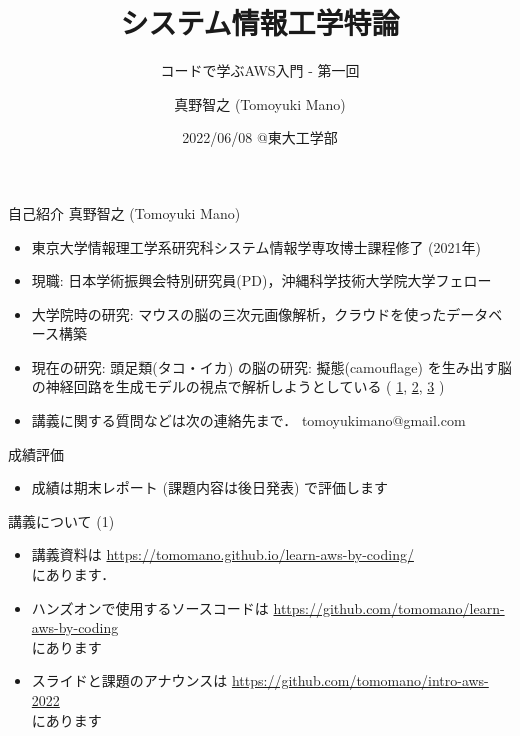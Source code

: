 \documentclass[unicode,11pt]{beamer}
\title{システム情報工学特論}
\subtitle{コードで学ぶAWS入門 - 第一回}
\author{真野智之 (Tomoyuki Mano)}
\institute[OIST]{Okinawa Institute of Science and Technology}
\date{2022/06/08 @東大工学部}
\begin{document}
\frame{\titlepage}

\begin{frame}{自己紹介}
真野智之 (Tomoyuki Mano)
\begin{itemize}
    \item 東京大学情報理工学系研究科システム情報学専攻博士課程修了 (2021年)
    \item 現職: 日本学術振興会特別研究員(PD)，沖縄科学技術大学院大学フェロー
    \item 大学院時の研究: マウスの脳の三次元画像解析，クラウドを使ったデータベース構築
    \item 現在の研究: 頭足類(タコ・イカ) の脳の研究: 擬態(camouflage) を生み出す脳の神経回路を生成モデルの視点で解析しようとしている
    (
    \href{https://twitter.com/CephWarden/status/1142083856893263872}{1},
    \href{https://twitter.com/CephWarden/status/1384644335069667334}{2},
    \href{https://twitter.com/CephWarden/status/1232307456346181632}{3}
    )
    \item 講義に関する質問などは次の連絡先まで． tomoyukimano@gmail.com
\end{itemize}
\end{frame}

\begin{frame}{成績評価}
\begin{itemize}
    \item 成績は期末レポート (課題内容は後日発表) で評価します
\end{itemize}
\end{frame}

\begin{frame}{講義について (1)}
\begin{itemize}
    \item 講義資料は
    \url{https://tomomano.github.io/learn-aws-by-coding/}\\
    にあります．
    \item ハンズオンで使用するソースコードは \url{https://github.com/tomomano/learn-aws-by-coding}\\
    にあります
    \item スライドと課題のアナウンスは
    \url{https://github.com/tomomano/intro-aws-2022}\\
    にあります
\end{itemize}
\end{frame}
\end{document}
